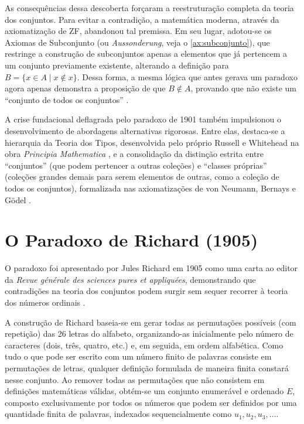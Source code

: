 As consequências dessa descoberta forçaram a reestruturação completa da teoria dos conjuntos. Para evitar a contradição, a matemática moderna, através da axiomatização de ZF, abandonou tal premissa. Em seu lugar, adotou-se os Axiomas de Subconjunto (ou \textit{Aussonderung}, veja o \autoref{ax:subconjunto}), que restringe a construção de subconjuntos apenas a elementos que já pertencem a um conjunto previamente existente, alterando a definição para \( B = \{x \in A \mid x \notin x\} \). Dessa forma, a mesma lógica que antes gerava um paradoxo agora apenas demonstra a proposição de que \( B \notin A \), provando que não existe um ``conjunto de todos os conjuntos'' \cite[p.~22]{enderton1977}.

A crise fundacional deflagrada pelo paradoxo de 1901 também impulsionou o desenvolvimento de abordagens alternativas rigorosas. Entre elas, destaca-se a hierarquia da Teoria dos Tipos, desenvolvida pelo próprio Russell e Whitehead na obra \textit{Principia Mathematica} \cite{russell1910}, e a consolidação da distinção estrita entre ``conjuntos'' (que podem pertencer a outras coleções) e ``classes próprias'' (coleções grandes demais para serem elementos de outras, como a coleção de todos os conjuntos), formalizada nas axiomatizações de von Neumann, Bernays e Gödel \cite[p.~15]{enderton1977}.


\section{O Paradoxo de Richard (1905)}

O paradoxo foi apresentado  por Jules Richard em 1905 como uma carta ao editor da \textit{Revue générale des sciences pures et appliquées}, demonstrando que contradições na teoria dos conjuntos podem surgir sem sequer recorrer à teoria dos números ordinais \parencite[p.~142]{heijenoort1967}.

A construção de Richard baseia-se em gerar todas as permutações possíveis (com repetição) das 26 letras do alfabeto, organizando-as inicialmente pelo número de caracteres (dois, três, quatro, etc.) e, em seguida, em ordem alfabética. Como tudo o que pode ser escrito com um número finito de palavras consiste em permutações de letras, qualquer definição formulada de maneira finita constará nesse conjunto. Ao remover todas as permutações que não consistem em definições matemáticas válidas, obtém-se um conjunto enumerável e ordenado \(E\), composto exclusivamente por todos os números que podem ser definidos por uma quantidade finita de palavras, indexados sequencialmente como \(u_1, u_2, u_3, \dots\).

